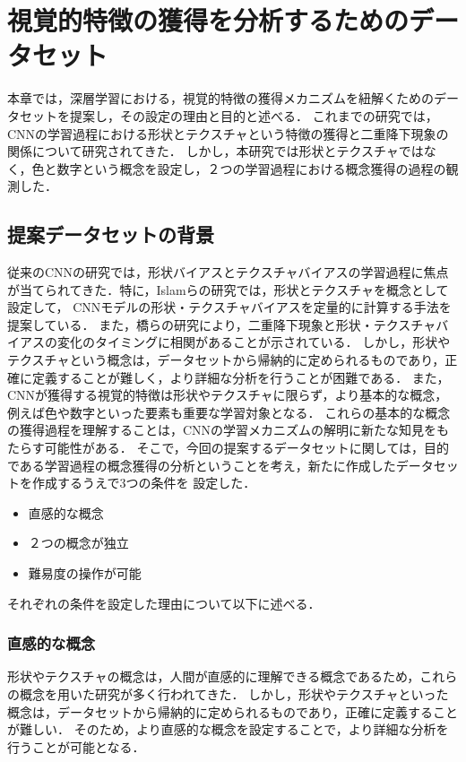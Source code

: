 \chapter{視覚的特徴の獲得を分析するためのデータセット}
\label{chap:experiment_settings}
本章では，深層学習における，視覚的特徴の獲得メカニズムを紐解くためのデータセットを提案し，その設定の理由と目的と述べる．
これまでの研究では，CNNの学習過程における形状とテクスチャという特徴の獲得と二重降下現象の関係について研究されてきた．
しかし，本研究では形状とテクスチャではなく，色と数字という概念を設定し，２つの学習過程における概念獲得の過程の観測した．

\section{提案データセットの背景}
従来のCNNの研究では，形状バイアスとテクスチャバイアスの学習過程に焦点が当てられてきた．特に，Islamらの研究では，形状とテクスチャを概念として設定して，
CNNモデルの形状・テクスチャバイアスを定量的に計算する手法を提案している．
また，橋らの研究により，二重降下現象と形状・テクスチャバイアスの変化のタイミングに相関があることが示されている．
しかし，形状やテクスチャという概念は，データセットから帰納的に定められるものであり，正確に定義することが難しく，より詳細な分析を行うことが困難である．
また，CNNが獲得する視覚的特徴は形状やテクスチャに限らず，より基本的な概念，例えば色や数字といった要素も重要な学習対象となる．
これらの基本的な概念の獲得過程を理解することは，CNNの学習メカニズムの解明に新たな知見をもたらす可能性がある．
そこで，今回の提案するデータセットに関しては，目的である学習過程の概念獲得の分析ということを考え，新たに作成したデータセットを作成するうえで3つの条件を
設定した．

\begin{itemize}
    \item 直感的な概念
    \item ２つの概念が独立
    \item 難易度の操作が可能
\end{itemize}

それぞれの条件を設定した理由について以下に述べる．

\subsection{直感的な概念}
形状やテクスチャの概念は，人間が直感的に理解できる概念であるため，これらの概念を用いた研究が多く行われてきた．
しかし，形状やテクスチャといった概念は，データセットから帰納的に定められるものであり，正確に定義することが難しい．
そのため，より直感的な概念を設定することで，より詳細な分析を行うことが可能となる．

